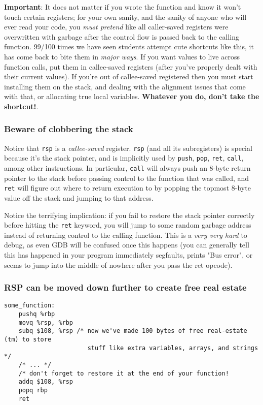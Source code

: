 \documentclass[11pt]{article}
\begin{document}
\textbf{Important}: It does not matter if you wrote the function and know it won't touch
certain registers; for your own sanity, and the sanity of anyone who will ever read your
code, you \emph{must pretend} like all caller-saved registers were overwritten with
garbage after the control flow is passed back to the calling function. 99/100 times we
have seen students attempt cute shortcuts like this, it has come back to bite them in
\emph{major ways}. If you want values to live across function calls, put them in
callee-saved registers (after you've properly dealt with their current values). If you're
out of callee-saved registered then you must start installing them on the stack, and
dealing with the alignment issues that come with that, or allocating true local variables.
\textbf{Whatever you do, don't take the shortcut!}.

\subsubsection{Beware of clobbering the stack}

Notice that \texttt{rsp} is a \emph{callee-saved} register. \texttt{rsp} (and all its
subregisters) is special because it's the stack pointer, and is implicitly used by
\texttt{push}, \texttt{pop}, \texttt{ret}, \texttt{call}, among other instructions. In
particular, \texttt{call} will always push an 8-byte return pointer to the stack before
passing control to the function that was called, and \texttt{ret} will figure out where to
return execution to by popping the topmost 8-byte value off the stack and jumping to that
address.

Notice the terrifying implication: if you fail to restore the stack pointer correctly
before hitting the \texttt{ret} keyword, you will jump to some random garbage address
instead of returning control to the calling function. This is a \emph{very very hard} to
debug, as even GDB will be confused once this happens (you can generally tell this has
happened in your program immediately segfaults, prints "Bus error", or seems to jump into
the middle of nowhere after you pass the ret opcode).

\subsubsection{RSP can be moved down further to create free real estate}

\begin{lstlisting}[caption={Allocating extra space on the stack}, captionpos=b]
some_function:
    pushq %rbp
    movq %rsp, %rbp
    subq $108, %rsp /* now we've made 100 bytes of free real-estate (tm) to store
                       stuff like extra variables, arrays, and strings */
    /* ... */
    /* don't forget to restore it at the end of your function!
    addq $108, %rsp
    popq rbp
    ret
\end{lstlisting}
\end{document}
